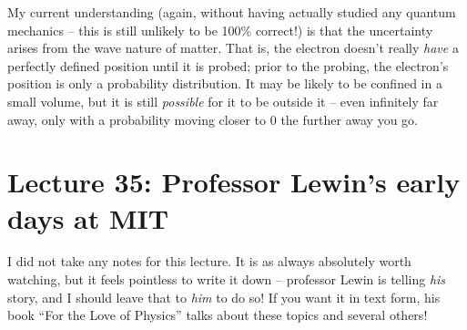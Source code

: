 \documentclass[8.01x]{subfiles}
\begin{document}
My current understanding (again, without having actually studied any quantum mechanics -- this is still unlikely to be 100\% correct!) is that the uncertainty arises from the wave nature of matter. That is, the electron doesn't really \emph{have} a perfectly defined position until it is probed; prior to the probing, the electron's position is only a probability distribution. It may be likely to be confined in a small volume, but it is still \emph{possible} for it to be outside it -- even infinitely far away, only with a probability moving closer to 0 the further away you go.

\section{Lecture 35: Professor Lewin's early days at MIT}

I did not take any notes for this lecture. It is as always absolutely worth watching, but it feels pointless to write it down -- professor Lewin is telling \emph{his} story, and I should leave that to \emph{him} to do so! If you want it in text form, his book ``For the Love of Physics'' talks about  these topics and several others!
\end{document}
